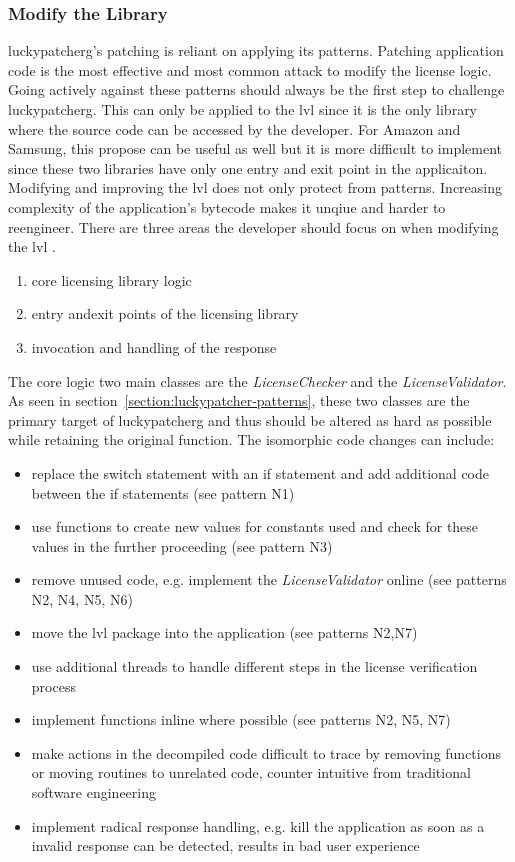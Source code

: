 \subsubsection{Modify the Library} \label{subsection:counter-modifications-library}

\gls{luckypatcherg}'s patching is reliant on applying its patterns.
Patching application code is the most effective and most common attack to modify the license logic.
Going actively against these patterns should always be the first step to challenge \gls{luckypatcherg}.
This can only be applied to the \gls{lvl} since it is the only library where the source code can be accessed by the developer.
For Amazon and Samsung, this propose can be useful as well but it is more difficult to implement since these two libraries have only one entry and exit point in the applicaiton.
\newline
Modifying and improving the \gls{lvl} does not only protect from patterns.
Increasing complexity of the application's bytecode makes it unqiue and harder to reengineer. \cite{developersSecuring}
\newline
There are three areas the developer should focus on when modifying the \gls{lvl}  \cite{developersSecuring}.
\begin{enumerate}
\item core licensing library logic
\item entry andexit points of the licensing library
\item invocation and handling of the response
\end{enumerate}
The core logic two main classes are the \textit{LicenseChecker} and the \textit{LicenseValidator}.
As seen in section~\ref{section:luckypatcher-patterns}, these two classes are the primary target of \gls{luckypatcherg} and thus should be altered as hard as possible while retaining the original function.
The isomorphic code changes can include:
\begin{itemize}
\item replace the switch statement with an if statement and add additional code between the if statements (see pattern N1)
\item use functions to create new values for constants used and check for these values in the further proceeding (see pattern N3)
\item remove unused code, e.g. implement the \textit{LicenseValidator} online (see patterns N2, N4, N5, N6)
\item move the \gls{lvl} package into the application (see patterns N2,N7)
\item use additional threads to handle different steps in the license verification process
\item implement functions inline where possible (see patterns N2, N5, N7)
\item make actions in the decompiled code difficult to trace by removing functions or moving routines to unrelated code, counter intuitive from traditional software engineering
\item implement radical response handling, e.g. kill the application as soon as a invalid response can be detected, results in bad user experience
\end{itemize}
